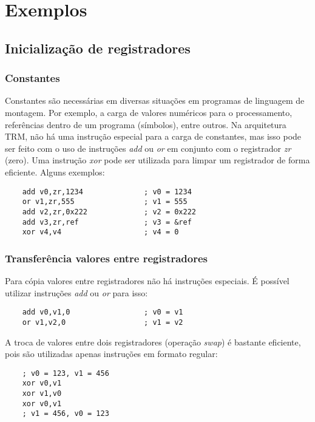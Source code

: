 \documentclass[11pt,a4paper]{report}
\begin{document}
\section{Exemplos}

\subsection{Inicialização de registradores}

\subsubsection{Constantes}

Constantes são necessárias em diversas situações em programas de
linguagem de montagem. Por exemplo, a carga de valores numéricos para
o processamento, referências dentro de um programa (símbolos), entre
outros. Na arquitetura TRM, não há uma instrução especial para a carga
de constantes, mas isso pode ser feito com o uso de instruções
\textit{add} ou \textit{or} em conjunto com o registrador \textit{zr}
(zero). Uma instrução \textit{xor} pode ser utilizada para limpar um
registrador de forma eficiente. Alguns exemplos:

\begin{verbatim}
    add v0,zr,1234              ; v0 = 1234
    or v1,zr,555                ; v1 = 555
    add v2,zr,0x222             ; v2 = 0x222
    add v3,zr,ref               ; v3 = &ref 
    xor v4,v4                   ; v4 = 0
\end{verbatim}

\subsubsection{Transferência valores entre registradores}

Para cópia valores entre registradores não há instruções especiais. É
possível utilizar instruções \textit{add} ou \textit{or} para isso:

\begin{verbatim}
    add v0,v1,0                 ; v0 = v1
    or v1,v2,0                  ; v1 = v2
\end{verbatim}

A troca de valores entre dois registradores (operação \textit{swap}) é
bastante eficiente, pois são utilizadas apenas instruções em formato
regular:

\begin{verbatim}
    ; v0 = 123, v1 = 456
    xor v0,v1
    xor v1,v0
    xor v0,v1
    ; v1 = 456, v0 = 123
\end{verbatim}
\end{document}
